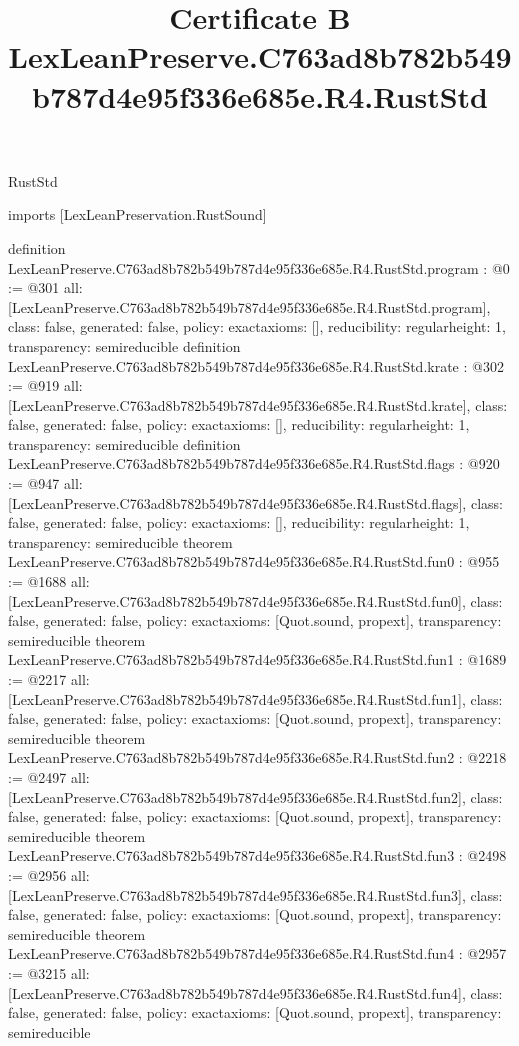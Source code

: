 \begin{lexlean}{RustStd}
\title{Certificate B LexLeanPreserve.C763ad8b782b549b787d4e95f336e685e.R4.RustStd}
\begin{coremodule}
imports [LexLeanPreservation.RustSound]

definition LexLeanPreserve.C763ad8b782b549b787d4e95f336e685e.R4.RustStd.program : @0 := @301 {
  all: [LexLeanPreserve.C763ad8b782b549b787d4e95f336e685e.R4.RustStd.program],
  class: false,
  generated: false,
  policy: exact{axioms: []},
  reducibility: regular{height: 1},
  transparency: semireducible
}
definition LexLeanPreserve.C763ad8b782b549b787d4e95f336e685e.R4.RustStd.krate : @302 := @919 {
  all: [LexLeanPreserve.C763ad8b782b549b787d4e95f336e685e.R4.RustStd.krate],
  class: false,
  generated: false,
  policy: exact{axioms: []},
  reducibility: regular{height: 1},
  transparency: semireducible
}
definition LexLeanPreserve.C763ad8b782b549b787d4e95f336e685e.R4.RustStd.flags : @920 := @947 {
  all: [LexLeanPreserve.C763ad8b782b549b787d4e95f336e685e.R4.RustStd.flags],
  class: false,
  generated: false,
  policy: exact{axioms: []},
  reducibility: regular{height: 1},
  transparency: semireducible
}
theorem LexLeanPreserve.C763ad8b782b549b787d4e95f336e685e.R4.RustStd.fun0 : @955 := @1688 {
  all: [LexLeanPreserve.C763ad8b782b549b787d4e95f336e685e.R4.RustStd.fun0],
  class: false,
  generated: false,
  policy: exact{axioms: [Quot.sound, propext]},
  transparency: semireducible
}
theorem LexLeanPreserve.C763ad8b782b549b787d4e95f336e685e.R4.RustStd.fun1 : @1689 := @2217 {
  all: [LexLeanPreserve.C763ad8b782b549b787d4e95f336e685e.R4.RustStd.fun1],
  class: false,
  generated: false,
  policy: exact{axioms: [Quot.sound, propext]},
  transparency: semireducible
}
theorem LexLeanPreserve.C763ad8b782b549b787d4e95f336e685e.R4.RustStd.fun2 : @2218 := @2497 {
  all: [LexLeanPreserve.C763ad8b782b549b787d4e95f336e685e.R4.RustStd.fun2],
  class: false,
  generated: false,
  policy: exact{axioms: [Quot.sound, propext]},
  transparency: semireducible
}
theorem LexLeanPreserve.C763ad8b782b549b787d4e95f336e685e.R4.RustStd.fun3 : @2498 := @2956 {
  all: [LexLeanPreserve.C763ad8b782b549b787d4e95f336e685e.R4.RustStd.fun3],
  class: false,
  generated: false,
  policy: exact{axioms: [Quot.sound, propext]},
  transparency: semireducible
}
theorem LexLeanPreserve.C763ad8b782b549b787d4e95f336e685e.R4.RustStd.fun4 : @2957 := @3215 {
  all: [LexLeanPreserve.C763ad8b782b549b787d4e95f336e685e.R4.RustStd.fun4],
  class: false,
  generated: false,
  policy: exact{axioms: [Quot.sound, propext]},
  transparency: semireducible
}
\end{coremodule}
\end{lexlean}
